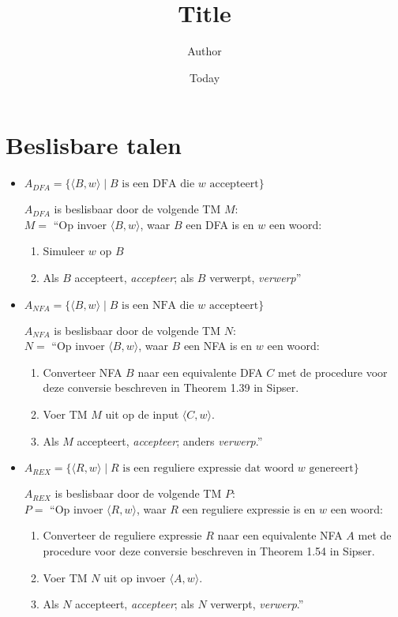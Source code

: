 \documentclass[]{article}
\begin{document}
\title{Title}
\author{Author}
\date{Today}
\maketitle

\section*{Beslisbare talen}
\begin{itemize}
	\item $A_{DFA} = \{ \langle B, w \rangle \mid B \mbox{ is een DFA die $w$ accepteert} \} $
	
	$A_{DFA}$ is beslisbaar door de volgende TM $M$: \\
	$M = $ ``Op invoer $\langle B, w \rangle$, waar $B$ een DFA is en $w$ een woord:
	\begin{enumerate}
		\item Simuleer $w$ op $B$
		\item Als $B$ accepteert, \emph{accepteer}; als $B$ verwerpt, \emph{verwerp}''
	\end{enumerate}
	
	
	\item $A_{NFA} = \{ \langle B, w \rangle \mid B \mbox{ is een NFA die $w$ accepteert} \} $
	
	$A_{NFA}$ is beslisbaar door de volgende TM $N$: \\
	$N = $ ``Op invoer $\langle B, w \rangle$, waar $B$ een NFA is en $w$ een woord:
	\begin{enumerate}
		\item Converteer NFA $B$ naar een equivalente DFA $C$ met de procedure voor deze conversie beschreven in Theorem 1.39 in Sipser.
		\item Voer TM $M$ uit op de input $\langle C, w \rangle$.
		\item Als $M$ accepteert, \emph{accepteer}; anders \emph{verwerp}.''
	\end{enumerate}
	
	
	\item $A_{REX} = \{ \langle R, w \rangle \mid R \mbox{ is een reguliere expressie dat woord $w$ genereert} \} $
	
	$A_{REX}$ is beslisbaar door de volgende TM $P$: \\
	$P = $ ``Op invoer $\langle R, w \rangle$, waar $R$ een reguliere expressie is en $w$ een woord:
	\begin{enumerate}
		\item Converteer de reguliere expressie $R$ naar een equivalente NFA $A$ met de procedure voor deze conversie beschreven in Theorem 1.54 in Sipser.
		\item Voer TM $N$ uit op invoer $\langle A, w \rangle$.
		\item Als $N$ accepteert, \emph{accepteer}; als $N$ verwerpt, \emph{verwerp}.''
	\end{enumerate}
	

\end{itemize}
\end{document}

